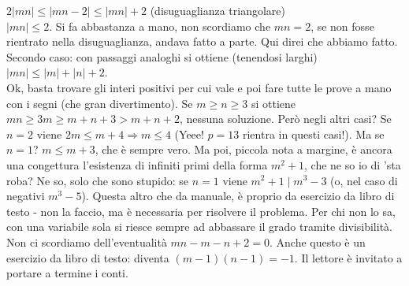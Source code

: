 \begin{sol}
  $2|mn| \le |mn-2| \le |mn|+2$ (disuguaglianza triangolare) \\
  $|mn| \le 2$. Si fa abbastanza a mano, non scordiamo che $mn=2$, se non fosse rientrato nella disuguaglianza, andava fatto a parte. Qui direi che abbiamo fatto. \\
  Secondo caso: con passaggi analoghi si ottiene (tenendosi larghi) \\
  $|mn| \le |m|+|n|+2$. \\
  Ok, basta trovare gli interi positivi per cui vale e poi fare tutte le prove a mano con i segni (che gran divertimento). Se $m \ge n \ge 3$ si ottiene \\
  $mn \ge 3m \ge m+n+3>m+n+2$, nessuna soluzione. Però negli altri casi? Se $n=2$ viene $2m \le m+4 \Rightarrow m \le 4$ (Yeee! $p=13$ rientra in questi casi!). Ma se $n=1$? $m \le m+3$, che è sempre vero. Ma poi, piccola nota a margine, è ancora una congettura l'esistenza di infiniti primi della forma $m^2+1$, che ne so io di 'sta roba? Ne so, solo che sono stupido: se $n=1$ viene $m^2+1 \mid m^3-3$ (o, nel caso di negativi $m^3-5$). Questa altro che da manuale, è proprio da esercizio da libro di testo - non la faccio, ma è necessaria per risolvere il problema. Per chi non lo sa, con una variabile sola si riesce sempre ad abbassare il grado tramite divisibilità. \\
  Non ci scordiamo dell'eventualità $mn-m-n+2=0$. Anche questo è un esercizio da libro di testo: diventa $(m-1)(n-1)=-1$. Il lettore è invitato a portare a termine i conti.
\end{sol}
